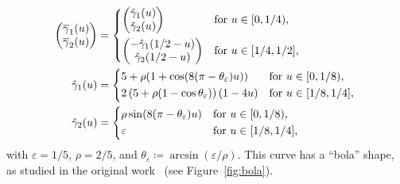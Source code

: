 \documentclass{article}
\theoremstyle{remark}
\theoremstyle{definition}
\numberwithin{equation}{section}
\begin{document}
\begin{align*}
    \begin{pmatrix}
        \overline{\gamma}_1(u)\\
        \overline{\gamma}_2(u)
    \end{pmatrix}
    &=\begin{dcases*}
        \begin{pmatrix}
            \hat{\gamma}_1(u)\\
            \hat{\gamma}_2(u)
        \end{pmatrix} & for $u\in[0,1/4)$,\\
        \begin{pmatrix}
            -\hat{\gamma}_1(1/2-u)\\
            \hat{\gamma}_2(1/2-u)
        \end{pmatrix} & for $u\in[1/4,1/2]$,
    \end{dcases*}\\
    \hat{\gamma}_1(u)&=\begin{dcases*}
        5+\rho(1+\cos(8(\pi-\theta_\varepsilon)u)) & for $u\in[0,1/8)$,\\
        2\left(5+\rho(1-\cos\theta_\varepsilon)\right)(1-4u) & for $u\in[1/8,1/4]$,
    \end{dcases*}\\
    \hat{\gamma}_2(u)&=\begin{dcases*}
        \rho\sin(8(\pi-\theta_\varepsilon)u) & for $u\in[0,1/8)$,\\
        \varepsilon & for $u\in[1/8,1/4]$,
    \end{dcases*}
\end{align*}
with $\varepsilon=1/5$, $\rho=2/5$, and $\theta_\varepsilon\coloneqq\arcsin(\varepsilon/\rho)$.
This curve has a ``bola'' shape, as studied in the original work~\cite{alexander2007domain} (see Figure~\ref{fig:bola}).
\end{document}
